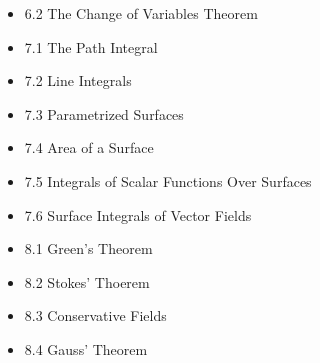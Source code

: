 \documentclass[11pt]{article}
\begin{document}
\begin{itemize}
  \item 6.2 The Change of Variables Theorem
  \item 7.1 The Path Integral
  \item 7.2 Line Integrals
  \item 7.3 Parametrized Surfaces
  \item 7.4 Area of a Surface
  \item 7.5 Integrals of Scalar Functions Over Surfaces
  \item 7.6 Surface Integrals of Vector Fields
  \item 8.1 Green's Theorem
  \item 8.2 Stokes' Thoerem
  \item 8.3 Conservative Fields
  \item 8.4 Gauss' Theorem
\end{itemize}
\end{document}
